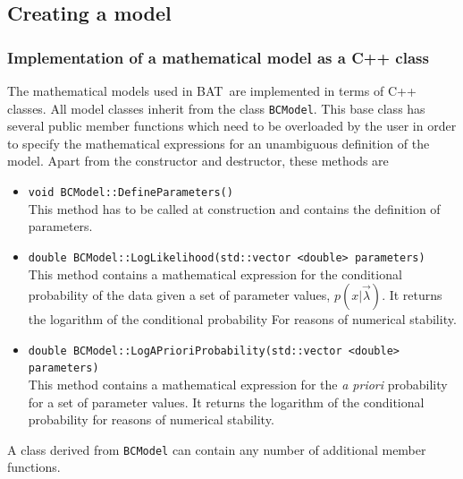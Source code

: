 \documentclass[11pt, a4paper]{article}
\newcommand{\bat}{{\sc BAT}}
\begin{document}

\subsection{Creating a model} 
\label{subsection:model}


\subsubsection{Implementation of a mathematical model as a C++ class} 
\label{subsubsection:implementation}

The mathematical models used in \bat\ are implemented in terms of C++
classes. All model classes inherit from the class \verb|BCModel|. This
base class has several public member functions which need to be
overloaded by the user in order to specify the mathematical
expressions for an unambiguous definition of the model. Apart from the
constructor and destructor, these methods are
% 
\begin{itemize}
\item \verb|void BCModel::DefineParameters()| \\
This method has to be called at construction and contains the
definition of parameters.
% 
\item
  \verb|double BCModel::LogLikelihood(std::vector <double> parameters)|
  \\ This method contains a mathematical expression for the
  conditional probability of the data given a set of parameter values,
  $p(x|\vec{\lambda})$. It returns the logarithm of the conditional
  probability For reasons of numerical stability. 
%
\item
  \verb|double BCModel::LogAPrioriProbability(std::vector <double> parameters)|
  \\ This method contains a mathematical expression for the {\it a
    priori} probability for a set of parameter values. It returns the
  logarithm of the conditional probability for reasons of numerical
  stability.
\end{itemize} 

\noindent 
A class derived from \verb|BCModel| can contain any number of
additional member functions.

\end{document}
